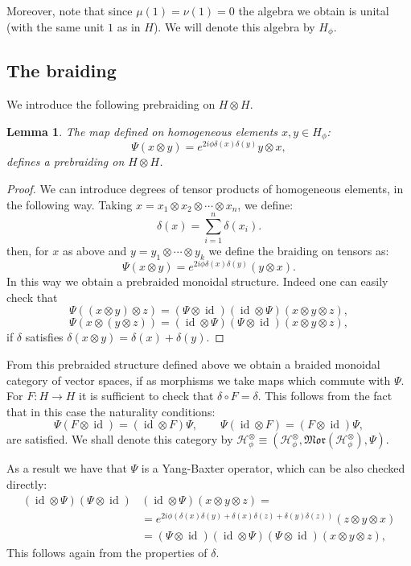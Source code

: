 \documentclass[12pt]{amsart}
\newtheorem{lem}[thm]{Lemma}
\theoremstyle{definition}
\numberwithin{equation}{section}
\newcommand{\ox}{\otimes}           %
\DeclareMathOperator{\id}{id}       %
\begin{document}
Moreover, note that since $\mu(1)=\nu(1)=0$ the algebra we obtain is unital (with the same unit 
$1$ as in $H$). We will denote this algebra by $H_\phi$.
\subsection{The braiding}
We introduce the following prebraiding on $H \otimes H$.
\begin{lem}
The map defined on homogeneous elements $x,y \in H_\phi$:
\begin{equation}
\Psi (x \otimes y) = e^{2 i\phi \delta(x)\delta(y)} y \otimes x, 
\label{braid}
\end{equation}
defines a prebraiding on $H\ox H$.
\end{lem}
\begin{proof}
We can introduce degrees of tensor products of homogeneous elements, in the
following way. Taking  $x= x_1 \otimes x_2 \otimes \cdots \otimes x_n$,
we define:
$$ \delta \left( x \right) = \sum_{i=1}^n \delta(x_i). $$
then, for $x$ as above and $y = y_1  \otimes \cdots \otimes y_k$
we define the braiding on tensors as:
$$
\Psi \left( x \otimes y  \right)
= e^{ 2 i \phi \delta(x) \delta(y)}   
\left( y \otimes x  \right). 
$$
In this way we obtain a prebraided monoidal structure. Indeed one can easily check that
$$ \Psi\left( (x \otimes y) \otimes z \right) = (\Psi \otimes \id) (\id \otimes \Psi)(x \otimes y \otimes z), $$
$$ \Psi\left( x \otimes (y \otimes z) \right) = (\id \otimes \Psi) (\Psi \otimes \id)(x \otimes y \otimes z), $$
if $\delta$ satisfies $\delta(x\ox y)=\delta(x)+\delta(y)$.
\end{proof}

From this prebraided structure defined above we obtain a braided monoidal category of vector spaces, if as morphisms we take maps which commute with $\Psi$. For $F:H\rightarrow H$ it is sufficient to check that $\delta \circ F = \delta$. This follows from the fact that in this case the naturality conditions:
$$ \Psi (F \otimes \id) = (\id \otimes F) \Psi, \qquad
\Psi  (\id \otimes F) = (F \otimes \id) \Psi, $$ are satisfied.
We shall denote this category by 
$\mathcal{H}_{\phi}^{\ox}\equiv \left(\mathcal{H}_{\phi}^{\ox}, %
\mathfrak{Mor}(\mathcal{H}_{\phi}^{\ox}),\Psi\right)$.


As a result we have that $\Psi$ is a Yang-Baxter operator, which can be also checked directly:
$$ 
\begin{aligned}
(\id \otimes \Psi) (\Psi \otimes \id) &(\id \otimes \Psi) (x \otimes y \otimes z)= \\
& = e^{2i\phi (\delta(x) \delta(y) + \delta(x) \delta(z) + \delta(y) \delta(z))} (z \otimes y \otimes x)  \\
& = (\Psi \otimes \id) (\id \otimes \Psi)  (\Psi \otimes \id) (x \otimes y \otimes z),
\end{aligned}
$$
This follows again from the properties of $\delta$. 
\end{document}
